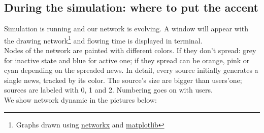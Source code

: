 \subsection{During the simulation: where to put the accent}\label{subsec:during}
Simulation is running and our network is evolving. A window will appear
with the drawing network\footnote{Graphs drawn using
  \href{https://networkx.github.io/}{networkx} and
  \href{https://matplotlib.org/}{matplotlib}}
and flowing time is displayed in terminal. \\
Nodes of the network are painted with different colors. If they don't
spread: grey for inactive state and blue for active one; if they spread
can be orange, pink or cyan depending on the spreaded news.
In detail, every source initially generates a single news, tracked by its
color. The source's size are bigger than users'one; sources are labeled with 0, 1 and 2. Numbering goes on with users.\\
We show network dynamic in the pictures below:
